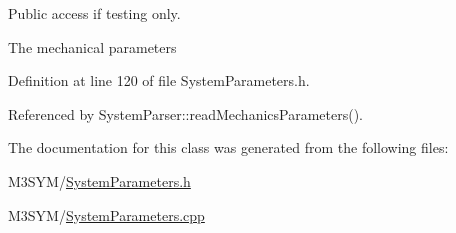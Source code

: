 Public access if testing only. 

The mechanical parameters 

Definition at line 120 of file System\+Parameters.\+h.



Referenced by System\+Parser\+::read\+Mechanics\+Parameters().



The documentation for this class was generated from the following files\+:\begin{DoxyCompactItemize}
\item 
M3\+S\+Y\+M/\hyperlink{SystemParameters_8h}{System\+Parameters.\+h}\item 
M3\+S\+Y\+M/\hyperlink{SystemParameters_8cpp}{System\+Parameters.\+cpp}\end{DoxyCompactItemize}
